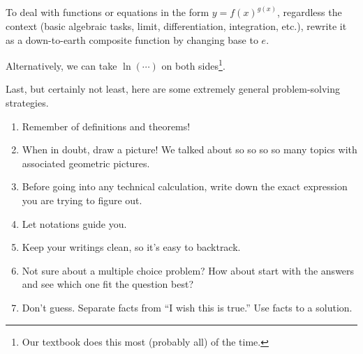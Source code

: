 \documentclass[../main.tex]{subfiles}
\begin{document}
To deal with functions or equations in the form \(y = f(x)^{g(x)}\), regardless the context (basic algebraic tasks, limit, differentiation, integration, etc.), rewrite it as a down-to-earth composite function by changing base to \(e\).


Alternatively, we can take \(\ln( \cdots{} )\) on both sides\footnote{Our textbook does this most (probably all) of the time.}.


\clearpage

Last, but certainly not least, here are some extremely general  problem-solving strategies.

\begin{enumerate}
  \item Remember  of definitions and theorems!
  \item When in doubt, draw a picture! We talked about so so so so many topics with associated geometric pictures.
  \item Before going into any technical calculation, write down the exact expression you are trying to figure out.
  \item Let notations guide you.
  \item Keep your writings clean, so it's easy to backtrack.
  \item Not sure about a multiple choice problem? How about start with the answers and see which one fit the question best?
  \item Don't guess. Separate facts from \enquote{I wish this is true.} Use facts to  a solution.
\end{enumerate}
\end{document}
